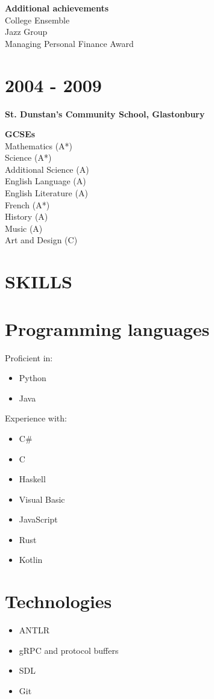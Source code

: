 \documentclass[margin]{res}
\begin{document}
\begin{resume}
{\bf Additional achievements} \\
College Ensemble \\
Jazz Group \\
Managing Personal Finance Award

\normalsize{\section{2004 - 2009}}
{\bf St. Dunstan's Community School, Glastonbury}

{\bf GCSEs} \\
Mathematics (A*) \\
Science (A*) \\
Additional Science (A) \\
English Language (A) \\
English Literature (A) \\
French (A*) \\
History (A) \\
Music (A) \\
Art and Design (C)

\section{SKILLS}

\normalsize{\section{Programming languages}}
Proficient in:
\begin{itemize}
\item Python
\item Java
\end{itemize}

\begin{samepage}
Experience with:
\begin{itemize}
\item C\#
\item C
\item Haskell
\item Visual Basic
\item JavaScript
\item Rust
\item Kotlin
\end{itemize}
\end{samepage}

\normalsize{\section{Technologies}}
\begin{itemize}
\item ANTLR
\item gRPC and protocol buffers
\item SDL
\item Git
\end{itemize}


\end{resume}
\end{document}
